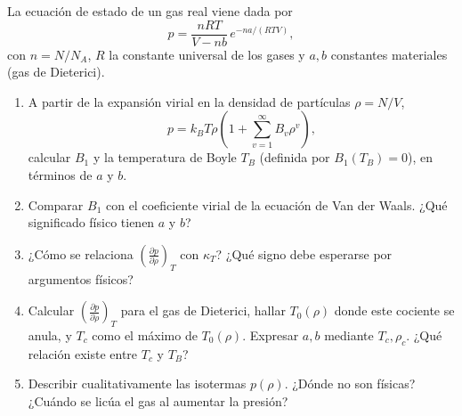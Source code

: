 \documentclass[12pt,a4paper]{article}
\newcommand{\paren}[1]{\left( #1 \right)}
\newcommand{\pd}[3]{\left(\frac{\partial #1}{\partial #2}\right)_{#3}}
\begin{document}
    \begin{problema}
        La ecuación de estado de un gas real viene dada por
        \begin{equation*}
            p=\frac{nRT}{V-nb}\,e^{-na/(RTV)},
        \end{equation*}
        con $n=N/N_{A}$, $R$ la constante universal de los gases y $a,b$ constantes materiales
        (gas de Dieterici).
        \begin{enumerate}
            \item[1)] A partir de la expansión virial en la densidad de partículas $\rho=N/V$,
            \begin{equation*}
                p=k_{B}T\rho\paren{1+\sum_{v=1}^{\infty}B_{v}\rho^{v}},
            \end{equation*}
            calcular $B_{1}$ y la temperatura de Boyle $T_{B}$ (definida por $B_{1}(T_{B})=0$),
            en términos de $a$ y $b$.
            \item[2)] Comparar $B_{1}$ con el coeficiente virial de la ecuación de Van der Waals.
            ¿Qué significado físico tienen $a$ y $b$?
            \item[3)] ¿Cómo se relaciona $\pd p\rho T$ con $\kappa_{T}$? ¿Qué signo debe
            esperarse por argumentos físicos?
            \item[4)] Calcular $\pd p\rho T$ para el gas de Dieterici, hallar $T_{0}(\rho)$
            donde este cociente se anula, y $T_{c}$ como el máximo de $T_{0}(\rho)$. Expresar
            $a,b$ mediante $T_{c},\rho_{c}$. ¿Qué relación existe entre $T_{c}$ y $T_{B}$?
            \item[5)] Describir cualitativamente las isotermas $p(\rho)$. ¿Dónde no son físicas?
            ¿Cuándo se licúa el gas al aumentar la presión?
        \end{enumerate}
    \end{problema}
\end{document}
